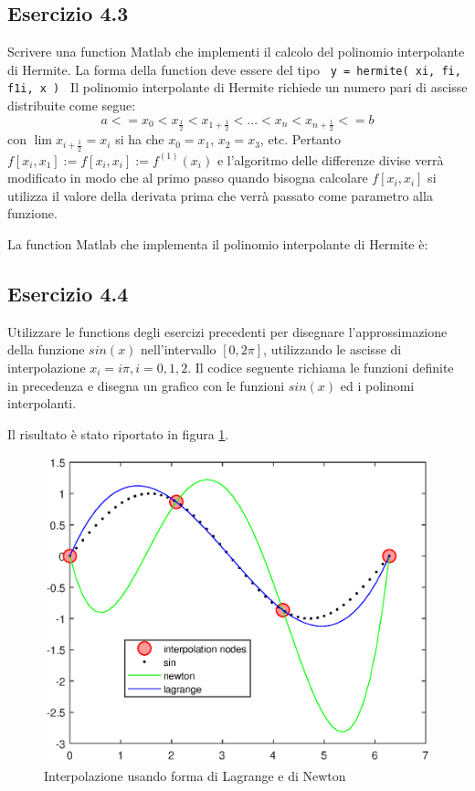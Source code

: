 	\subsection {Esercizio 4.3}
	
Scrivere una function Matlab che implementi il calcolo del polinomio interpolante di Hermite. La forma della function deve essere del tipo \texttt{ y = hermite( xi, fi, f1i, x ) }
\PP
Il polinomio interpolante di Hermite richiede un numero pari di ascisse distribuite come segue: 
\begin{equation}
	a <= x_0 < x_{\frac{1}{2}} < x_{1+\frac{1}{2}} < ... < x_n < x_{n+\frac{1}{2}} <= b
\end{equation}
con $\lim{x_{i+\frac{1}{2}} = x_i}$ si ha che $x_0 = x_1$, $x_2=x_3$, etc. Pertanto $f[x_i, x_1]:=f[x_i, x_i]:=f^{(1)}(x_i)$ e l'algoritmo delle differenze divise verrà modificato in modo che al primo passo quando bisogna calcolare $f[x_i, x_i]$ si utilizza il valore della derivata prima che verrà passato come parametro alla funzione.

La function Matlab che implementa il polinomio interpolante di Hermite è:



	\pagebreak
	\subsection {Esercizio 4.4}
	
Utilizzare le functions degli esercizi precedenti per disegnare l'approssimazione della funzione $sin(x)$  nell'intervallo $[0, 2\pi]$, utilizzando le ascisse di interpolazione $x_{i}=i\pi, i=0,1,2$.
\PP
Il codice seguente richiama le funzioni definite in precedenza e disegna un grafico con le funzioni $sin(x)$ ed i polinomi interpolanti.

Il risultato è stato riportato in figura \ref{sin_interpolation}.

\begin{figure}[h]\label{sin_interpolation}
    \centering
    \includegraphics[scale=0.7]{./capitolo_4/sin_interpolation}
    \caption{Interpolazione usando forma di Lagrange e di Newton}
\end{figure} 



